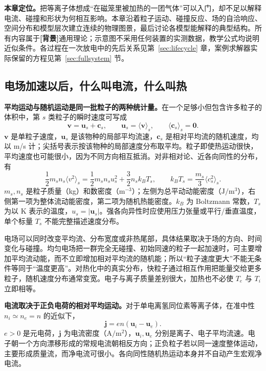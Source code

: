 \documentclass[12pt,fontset=none]{ctexart}
\numberwithin{equation}{section}
\numberwithin{table}{section}
\numberwithin{figure}{section}
\newcommand{\evbg}{\textbf{[背景]}}
\begin{document}
\textbf{本章定位。}把等离子体想成``在磁笼里被加热的一团气体''可以入门，却不足以解释电流、碰撞和形状为何相互影响。本章沿着粒子运动、碰撞反应、场的自洽响应、空间分布和模型层次建立连续的物理图景，最后讨论各模型能解释的典型结构。所有内容属于\evbg{}通用理论；示意图不采用任何装置的实测数据，教学公式均说明近似条件。各过程在一次放电中的先后关系见第~\ref{sec:lifecycle} 章，案例求解器实际保留的方程见第~\ref{sec:fullsystem} 节。

\subsection{电场加速以后，什么叫电流，什么叫热}\label{sec:micro-heat}

\textbf{平均运动与随机运动是同一批粒子的两种统计量。}在一个足够小但包含许多粒子的体积中，第 $s$ 类粒子的瞬时速度可写成
\begin{equation}\label{eq:micro-velocity}
 \bm v=\bm u_s+\bm c_s,\qquad
 \bm u_s=\langle\bm v\rangle_s,\qquad \langle\bm c_s\rangle_s=\bm0.
\end{equation}
$\bm v$ 是单粒子速度，$\bm u_s$ 是该物种的局部平均流速，$\bm c_s$ 是相对平均流的随机速度，均以 m/s 计；尖括号表示按该物种的局部速度分布取平均。粒子即使热运动很快，平均速度也可能很小，因为不同方向相互抵消。对非相对论、近各向同性的分布，有
\begin{equation}\label{eq:micro-energy-split}
 \frac12m_sn_s\langle v^2\rangle_s
 =\frac12m_sn_su_s^2+\frac32n_sk_BT_s,
 \qquad k_BT_s=\frac{m_s}{3}\langle c_s^2\rangle_s.
\end{equation}
$m_s,n_s$ 是粒子质量（kg）和数密度（$\mathrm{m^{-3}}$）；左侧为总平动动能密度（$\mathrm{J/m^3}$），右侧第一项为整体流动能密度，第二项为随机热能密度。$k_B$ 为 Boltzmann 常数，$T_s$ 为以 K 表示的温度，$u_s=|\bm u_s|$。强各向异性时应使用压力张量或平行/垂直温度，单个标量 $T_s$ 不能完整描述速度分布。

电场可以同时改变平均流、分布宽度或非热尾部，具体结果取决于场的方向、时间变化与碰撞。均匀电场把一群完全无碰撞、初始同速的粒子一起加速时，可主要增加平均流动能，而不立即增加相对平均流的随机能；所以``粒子速度更大''不能无条件等同于``温度更高''。对热化中的真实分布，快粒子通过相互作用把能量交给更多粒子，随机速度分布通常变宽。电子与离子质量差别很大，加热也不必使 $T_e$ 与 $T_i$ 立即相等。

\textbf{电流取决于正负电荷的相对平均运动。}对于单电离氢同位素等离子体，在准中性 $n_i\simeq n_e=n$ 的近似下，
\begin{equation}\label{eq:micro-current}
 \bm j=en(\bm u_i-\bm u_e).
\end{equation}
$e>0$ 是元电荷，$\bm j$ 为电流密度（$\mathrm{A/m^2}$），$\bm u_i,\bm u_e$ 分别是离子、电子平均流速。电子朝一个方向漂移形成的常规电流朝相反方向；正负粒子若以同一速度整体运动，主要形成质量流，而净电流可很小。各向同性随机热运动本身并不自动产生宏观净电流。
\end{document}
